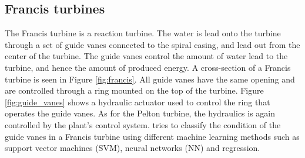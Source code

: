 

    
    \subsection{Francis turbines}\label{subsec:francis}
        The Francis turbine is a reaction turbine. The water is lead onto the turbine through a set of guide vanes connected to the spiral casing, and lead out from the center of the turbine. The guide vanes control the amount of water lead to the turbine, and hence the amount of produced energy. A cross-section of a Francis turbine is seen in Figure \ref{fig:francis}. All guide vanes have the same opening and are controlled through a ring mounted on the top of the turbine. Figure \ref{fig:guide_vanes} shows a hydraulic actuator used to control the ring that operates the guide vanes. As for the Pelton turbine, the hydraulics is again controlled by the plant's control system. \cite{Aasnes2017} tries to classify the condition of the guide vanes in a Francis turbine using different machine learning methods such as support vector machines (SVM), neural networks (NN) and regression.   
        
